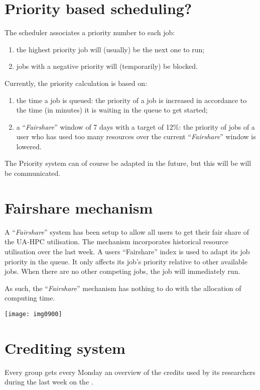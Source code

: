\section{Priority based scheduling?}

The scheduler associates a priority number to each job:

\begin{enumerate}
\item  the highest priority job will (usually) be the next one to run;
\item  jobs with a negative priority will (temporarily) be blocked.
\end{enumerate}

Currently, the priority calculation is based on:

\begin{enumerate}
\item  the time a job is queued: the priority of a job is increased in accordance to the time (in minutes) it is waiting in the queue to get started;
\item  a ``\emph{Fairshare}'' window of 7 days with a target of 12\%: the priority of jobs of a user who has used too many resources over the current ``\emph{Fairshare}'' window is lowered.
\end{enumerate}

The Priority system can of course be adapted in the future, but this will be will be communicated.


\section{Fairshare mechanism}

A ``\emph{Fairshare}'' system has been setup to allow all users to get their
fair share of the UA-HPC utilisation.  The mechanism incorporates historical
resource utilisation over the last week.  A users ``Fairshare'' index is used
to adapt its job priority in the queue.  It only affects its job's priority
relative to other available jobs. When there are no other competing jobs, the
job will immediately run.

As such, the ``\emph{Fairshare}'' mechanism has nothing to do with the
allocation of computing time.

\texttt{[image: img0900]}


\section{Crediting system}

Every group gets every Monday an overview of the credits used by its researchers during the last week on the \hpc.
